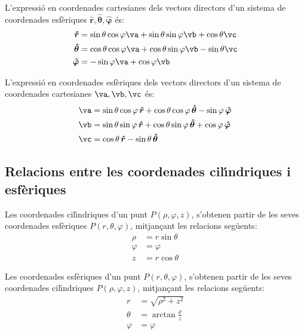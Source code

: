 \documentclass[catalan,a4paper,twoside,11pt]{article}
\begin{document}
L'expressi\'{o} en coordenades cartesianes dels vectors directors d'un sistema de coordenades  esf\`{e}riques $\boldsymbol{\hat{r}},\boldsymbol{\hat{\theta}},\boldsymbol{\hat{\varphi}}$ \'{e}s:
\begin{subequations}\begin{align}
    \boldsymbol{\hat{r}} &=\sin\theta\cos\varphi\va+ \sin\theta\sin\varphi\vb+\cos\theta\vc\\
    \boldsymbol{\hat{\theta}} &=\cos\theta\cos\varphi\va+
    \cos\theta\sin\varphi\vb-\sin\theta\vc\\
    \boldsymbol{\hat{\varphi}}&=-\sin\varphi\va+\cos\varphi\vb
\end{align}\end{subequations}

L'expressi\'{o} en coordenades esf\`{e}riques dels vectors directors d'un sistema de coordenades  cartesianes $\va,\vb,\vc$ \'{e}s:
\begin{subequations}\begin{align}
    \va &=\sin\theta\cos\varphi\,\boldsymbol{\hat{r}}+
    \cos\theta\cos\varphi\,\boldsymbol{\hat{\theta}}-\sin\varphi\,\boldsymbol{\hat{\varphi}}\\
    \vb &=\sin\theta\sin\varphi\,\boldsymbol{\hat{r}}+
    \cos\theta\sin\varphi\,\boldsymbol{\hat{\theta}}+\cos\varphi\,\boldsymbol{\hat{\varphi}}\\
    \vc &=\cos\theta\,\boldsymbol{\hat{r}}-\sin\theta\,\boldsymbol{\hat{\theta}}
\end{align}\end{subequations}

\subsection{Relacions entre les coordenades cil\'{\i}ndriques i
esf\`{e}riques}

Les coordenades cil\'{\i}ndriques  d'un punt $P(\rho,\varphi,z)$,
s'obtenen partir de les seves coordenades esf\`{e}riques
$P(r,\theta,\varphi)$, mitjan\c{c}ant les relacions seg\"{u}ents:
\begin{subequations}\begin{align}
    \rho &=r\sin\theta \\ \varphi &=\varphi \\z &=r\cos\theta
\end{align}\end{subequations}

Les coordenades  esf\`{e}riques  d'un punt $P(r,\theta,\varphi)$,
s'obtenen partir de les seves coordenades cil\'{\i}ndriques
$P(\rho,\varphi,z)$, mitjan\c{c}ant les relacions seg\"{u}ents:
\begin{subequations}\begin{align}
    r &=\sqrt{\rho^2+z^2}\\
    \theta &=\arctan\frac{\rho}{z}\\
    \varphi &=\varphi
\end{align}\end{subequations}
\end{document}
